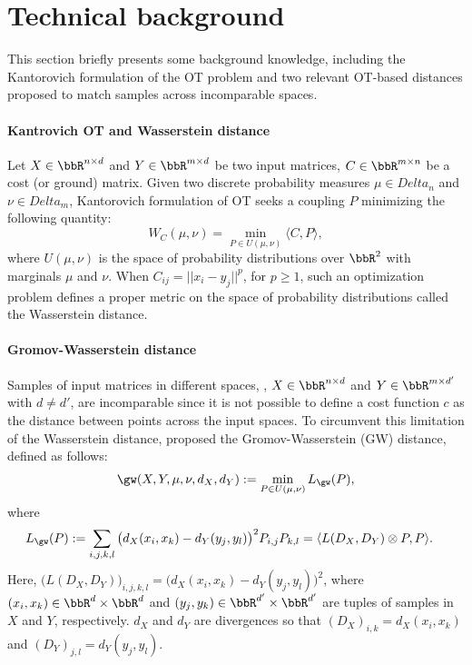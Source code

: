 \section{Technical background}

This section briefly presents some background knowledge,
including the Kantorovich formulation of the OT problem and two relevant OT-based distances
proposed to match samples across incomparable spaces.

\paragraph{Kantrovich OT and Wasserstein distance}
Let $X \in \bbR^{n\times d}$ and $Y \in \bbR^{m\times d}$ be two input matrices,
$C \in \bbR^{m \times n}$ be a cost (or ground) matrix.
Given two discrete probability measures $\mu \in Delta_n$ and $\nu\in Delta_m$,
Kantorovich formulation of OT seeks a coupling $P$ minimizing the following quantity:
\begin{equation}
  W_C(\mu,\nu) = \min_{P \in U(\mu,\nu)} \langle C, P \rangle,
  \label{eq:wasserstein}
 \end{equation}
where $U(\mu,\nu)$ is the space of probability distributions over
$\bbR^2$ with marginals $\mu$ and $\nu$. When $C_{ij} = ||x_i - y_j||^p$, for $p \geq 1$,
such an optimization problem defines a proper metric on the space of
probability distributions called the Wasserstein distance.

\paragraph{Gromov-Wasserstein distance}
Samples of input matrices in different spaces, \ie, $X \in \bbR^{n\times d}$
and $Y \in \bbR^{m\times d'}$ with $d \neq d'$, are incomparable since
it is not possible to define a cost function $c$ as the distance between points across
the input spaces.
To circumvent this limitation of the Wasserstein distance, \citep{Memoli11}
proposed the Gromov-Wasserstein (GW) distance, defined as follows:
\begin{align}
    \gw(X, Y, \mu, \nu, d_X, d_Y) := \min_{P \in U(\mu, \nu)} L_{\gw} (P),
\end{align}
where
\begin{align*}
\label{eq:gw_func}
    L_{\gw} (P) &:=
    \sum_{i,j,k,l} \big( d_X(x_i,x_k) - d_Y(y_j,y_l) \big)^2 P_{i,j}P_{k,l}
    = \langle L(D_X, D_Y) \otimes P, P \rangle.
\end{align*}
Here, $\big( L(D_X, D_Y) \big)_{i,j,k,l} = \big( d_X(x_i,x_k) - d_Y(y_j,y_l) \big)^2$,
where $(x_i, x_k) \in \bbR^d \times \bbR^d$ and $(y_j, y_k) \in \bbR^{d'} \times \bbR^{d'}$
are tuples of samples in $X$ and $Y$, respectively.
$d_X$ and $d_Y$ are divergences so that $(D_X)_{i,k} = d_X(x_i,x_k)$ and
$(D_Y)_{j,l} = d_Y(y_j,y_l)$.

